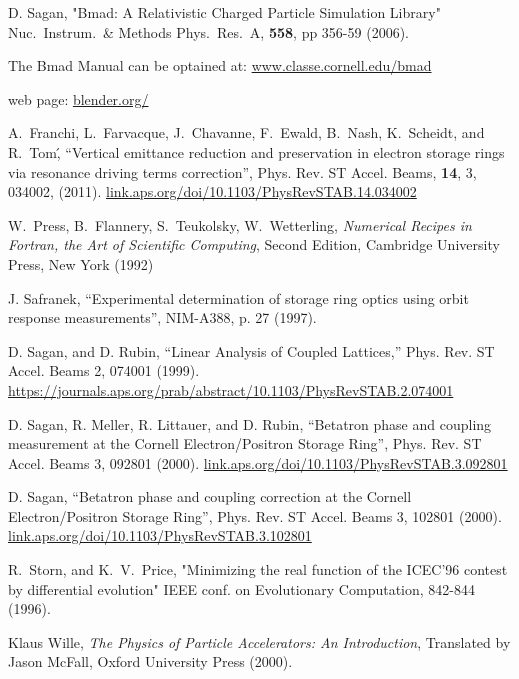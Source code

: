 \begin{thebibliography}{99}

D. Sagan,
"Bmad: A Relativistic Charged Particle Simulation Library"
Nuc.\ Instrum.\ \& Methods Phys.\ Res.\ A, {\bf 558}, pp 356-59 (2006).

The Bmad Manual can be optained at:
\hfill\break
\hspace*{20pt} 
\url{www.classe.cornell.edu/bmad}

 web page:
\hfill\break
\hspace*{20pt} 
\url{blender.org/}

A.~Franchi, L.~Farvacque, J.~Chavanne, F.~Ewald, B.~Nash, K.~Scheidt, and R.~Tom\',
``Vertical emittance reduction and preservation in electron storage rings via resonance driving terms correction'',
Phys. Rev. ST Accel. Beams,
{\bf 14}, 3, 034002, (2011). 
\hfill\break
\hspace*{20pt}
\url{link.aps.org/doi/10.1103/PhysRevSTAB.14.034002}

W.~Press, B.~Flannery, S.~Teukolsky, W.~Wetterling,
{\em Numerical Recipes in Fortran, the Art of Scientific Computing},
Second Edition, Cambridge University Press, New York (1992)

J. Safranek, ``Experimental determination of storage ring optics
using orbit response measurements'', NIM-A388, p. 27 (1997).

D. Sagan, and D. Rubin,
``Linear Analysis of Coupled Lattices,''
Phys. Rev. ST Accel. Beams 2, 074001 (1999).
\hfill\break
\hspace*{20pt}
\url{https://journals.aps.org/prab/abstract/10.1103/PhysRevSTAB.2.074001}

D. Sagan, R. Meller, R. Littauer, and D. Rubin,
``Betatron phase and coupling measurement at the Cornell Electron/Positron Storage Ring'', 
Phys. Rev. ST Accel. Beams 3, 092801 (2000).
\hfill\break
\hspace*{20pt}
\url{link.aps.org/doi/10.1103/PhysRevSTAB.3.092801}

D. Sagan,
``Betatron phase and coupling correction at the Cornell Electron/Positron
Storage Ring'', Phys. Rev. ST Accel. Beams 3, 102801 (2000).
\hfill\break
\hspace*{20pt}
\url{link.aps.org/doi/10.1103/PhysRevSTAB.3.102801}

R.~Storn, and K.~V.~Price, "Minimizing the real function of the
ICEC'96 contest by differential evolution" IEEE conf. on Evolutionary
Computation, 842-844 (1996).

Klaus Wille, {\em The Physics of Particle Accelerators: An Introduction},
Translated by Jason McFall, Oxford University Press (2000).

\end{thebibliography}
